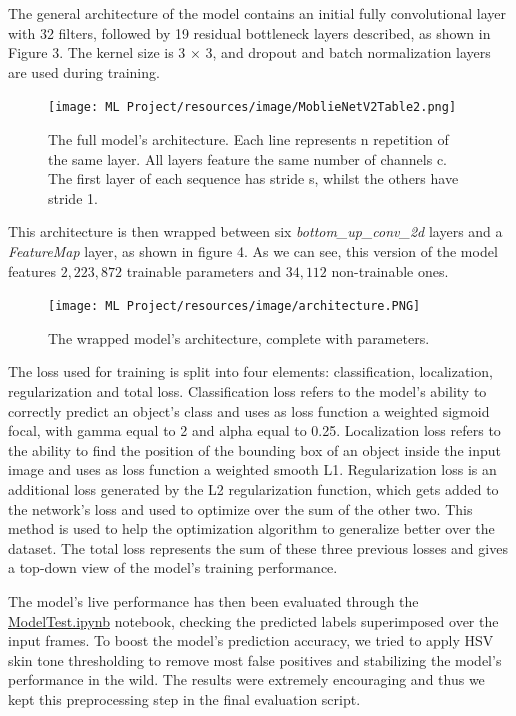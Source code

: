 \documentclass[a4paper, 12pt]{article}
\begin{document}
\begin{flushleft}
The general architecture of the model contains an initial fully convolutional layer with 32 filters, followed by 19 residual bottleneck layers described, as shown in Figure 3. The kernel size is 3 × 3, and dropout and batch normalization layers are used during training.

\begin{figure}[!h]
    \centering
    \texttt{[image: ML Project/resources/image/MoblieNetV2Table2.png]} \caption{The full model's architecture. Each line represents n repetition of the same layer. All layers feature the same number of channels c. The first layer of each sequence has stride s, whilst the others have stride 1.}
\end{figure}
\label{figure3}

This architecture is then wrapped between six \textit{bottom\_up\_conv\_2d} layers and a \textit{FeatureMap} layer, as shown in figure 4.
As we can see, this version of the model features $2,223,872$ trainable parameters and $34,112$ non-trainable ones.\linebreak

\begin{figure}[!h]
    \centering
    \texttt{[image: ML Project/resources/image/architecture.PNG]} \caption{The wrapped model's architecture, complete with parameters.}
\end{figure}
\label{figure4}

The loss used for training is split into four elements: classification, localization, regularization and total loss.
Classification loss refers to the model's ability to correctly predict an object's class and uses as loss function a weighted sigmoid focal, with gamma equal to 2 and alpha equal to 0.25.
Localization loss refers to the ability to find the position of the bounding box of an object inside the input image and uses as loss function a weighted smooth L1.
Regularization loss is an additional loss generated by the L2 regularization function, which gets added to the network's loss and used to optimize over the sum of the other two. This method is used to help the optimization algorithm to generalize better over the dataset.
The total loss represents the sum of these three previous losses and gives a top-down view of the model's training performance.\linebreak

The model's live performance has then been evaluated through the \href{https://github.com/MarzioVallero/ML-Based-Blender-Gestural-Input-Interface/blob/master/ModelTest.ipynb}{ModelTest.ipynb} notebook, checking the predicted labels superimposed over the input frames.\linebreak
To boost the model's prediction accuracy, we tried to apply HSV skin tone thresholding to remove most false positives and stabilizing the model's performance in the wild. The results were extremely encouraging and thus we kept this preprocessing step in the final evaluation script.

\end{flushleft}
\end{document}
